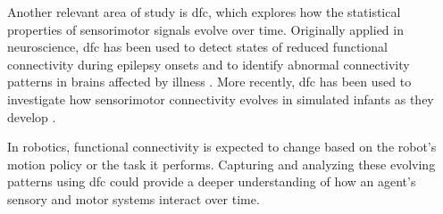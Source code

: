 Another relevant area of study is \ac{dfc}, which explores how the statistical properties of sensorimotor signals evolve over time. Originally applied in neuroscience, \ac{dfc} has been used to detect states of reduced functional connectivity during epilepsy onsets \cite{Christiaen2020Dynamicfunctionalconnectivity} and to identify abnormal connectivity patterns in brains affected by illness \cite{Zhou2020Earlychildhooddevelopmental}. More recently, \ac{dfc} has been used to investigate how sensorimotor connectivity evolves in simulated infants as they develop \cite{Kanazawa2023Openendedmovements}.

In robotics, functional connectivity is expected to change based on the robot’s motion policy or the task it performs. Capturing and analyzing these evolving patterns using \ac{dfc} could provide a deeper understanding of how an agent’s sensory and motor systems interact over time.

